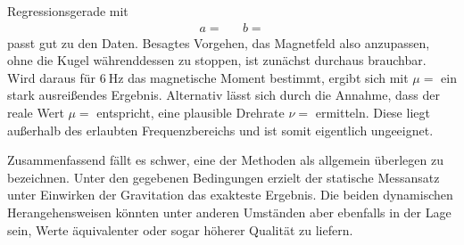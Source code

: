 Regressionsgerade mit
\begin{align*}
	a =  && b = 
\end{align*}
passt gut zu den Daten. Besagtes Vorgehen, das Magnetfeld also anzupassen, ohne die Kugel währenddessen zu stoppen,
ist zunächst durchaus brauchbar. Wird daraus für $\qty{6}{\hertz}$ das magnetische Moment bestimmt, ergibt sich mit
$\mu = $ ein stark ausreißendes Ergebnis. Alternativ lässt sich durch die
Annahme, dass der reale Wert $\mu = $ entspricht, eine plausible Drehrate
$\nu = $ ermitteln. Diese liegt außerhalb des erlaubten Frequenzbereichs und ist somit
eigentlich ungeeignet. 

Zusammenfassend fällt es schwer, eine der Methoden als allgemein überlegen zu bezeichnen. Unter den gegebenen Bedingungen
erzielt der statische Messansatz unter Einwirken der Gravitation das exakteste Ergebnis. Die beiden dynamischen
Herangehensweisen könnten unter anderen Umständen aber ebenfalls in der Lage sein, Werte äquivalenter oder sogar
höherer Qualität zu liefern.
